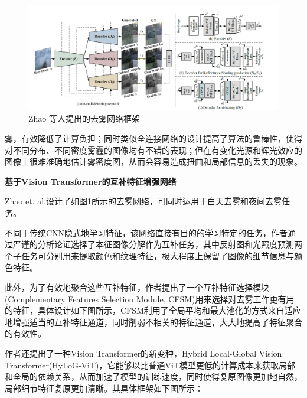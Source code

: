 \begin{figure}[H]
\centering
\includegraphics[width=1.0\linewidth]{pics/screenshot007}
\caption{Zhao 等人提出的去雾网络框架}
\label{fig:screenshot007}
\end{figure}

\begin{multicols}{2}

\noindent 雾，有效降低了计算负担；同时类似全连接网络的设计提高了算法的鲁棒性，使得对不同分布、不同密度雾霾的图像均有不错的表现；但在有变化光源和辉光效应的图像上很难准确地估计雾密度图，从而会容易造成扭曲和局部信息的丢失的现象。

\noindent\textbf{基于Vision Transformer的互补特征增强网络}

 Zhao et. al.\cite{23}设计了如图\ref{fig:screenshot007}所示的去雾网络，可同时运用于白天去雾和夜间去雾任务。
 
 不同于传统CNN隐式地学习特征，该网络直接有目的的学习特定的任务，作者通过严谨的分析论证选择了本征图像分解作为互补任务，其中反射图和光照度预测两个子任务可分别用来提取颜色和纹理特征，极大程度上保留了图像的细节信息与颜色特征。
 
 此外，为了有效地聚合这些互补特征，作者提出了一个互补特征选择模块(Complementary Features Selection Module, CFSM)用来选择对去雾工作更有用的特征，具体设计如下图所示，CFSM利用了全局平均和最大池化的方式来自适应地增强适当的互补特征通道，同时削弱不相关的特征通道，大大地提高了特征聚合的有效性。
 
 作者还提出了一种Vision Transformer的新变种，Hybrid Local-Global Vision Transformer(HyLoG-ViT)，它能够以比普通ViT模型更低的计算成本来获取局部和全局的依赖关系，从而加速了模型的训练速度，同时使得复原图像更加地自然，局部细节特征复原更加清晰。其具体框架如下图所示：


\end{multicols}
